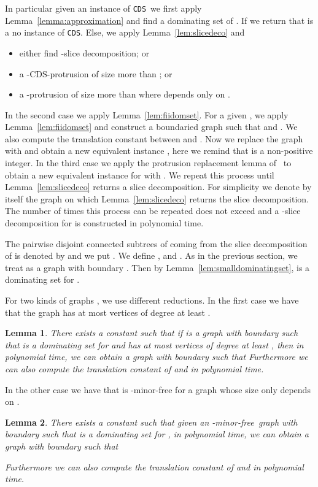 \documentclass[11pt]{article}
\newtheorem{lemma}{Lemma}
\newcommand{\Hmf}{-minor-free}
\newcommand{\tCDS}{{\texttt{\sc CDS}}}
\begin{document}
In particular given an instance  of \tCDS \,  we first apply Lemma~\ref{lemma:approximation} and find  a dominating set  of . 
If  we return that  is a {\sc no} instance of \tCDS. Else, 
we apply Lemma~\ref{lem:slicedeco} and
\begin{itemize}
\item  either find  -slice decomposition; or 
\item a -{\sc CDS}-protrusion of size more than ; or
\item a -protrusion of size more than  where  depends only on .
\end{itemize}
In the second case we apply Lemma~\ref{lem:fiidomset}. For a given , we apply Lemma~\ref{lem:fiidomset} and construct a boundaried graph  such that  and . We also compute the translation constant  between  
and .  Now we replace the graph  with  and obtain a new equivalent instance , here we remind that  is a  non-positive integer. In the third case we apply the protrusion replacement lemma of~\cite[Lemma~7]{H.Bodlaender:2009ng} to obtain a new equivalent instance  for  with . We repeat this process until Lemma~\ref{lem:slicedeco}  returns a slice decomposition. 
For simplicity we denote by  itself the graph on which Lemma~\ref{lem:slicedeco} returns the slice decomposition. The number of times this process can be repeated  does not exceed   and a  -slice decomposition for  is constructed  in polynomial time.   

 The pairwise disjoint connected subtrees   of  coming 
from the slice decomposition of  is denoted by   and we put  .
We define   ,  and .  
As in the previous section,  we   treat   as a  graph with boundary .  
Then by Lemma~\ref{lem:smalldominatingset},  
 is a dominating set for . 

For  two kinds of graphs , we use different reductions. 
 In the first case we have that the graph  has at most  vertices of degree at least .
\begin{lemma}
\label{lem:newperspectivequasicds}
There exists a constant  such that if    is a graph with boundary   such that  is a dominating set for  and  has at most  vertices of degree at least , then in polynomial time, we can obtain a graph  with boundary  
such that  
Furthermore we can also compute the translation constant  of  and  in polynomial time. 
\end{lemma}
  In the other  case we have that  is -minor-free for a graph  whose size only depends on .  \begin{lemma}
\label{lem:newperspectiveHminorcds}
There exists a constant  such that  given an \Hmf \, graph   with boundary  
such that  is a dominating set for , in polynomial time, we can obtain a graph  with boundary  such that 
 
Furthermore we can also compute the translation constant  of  and  in polynomial time. 
\end{lemma}
\end{document}
